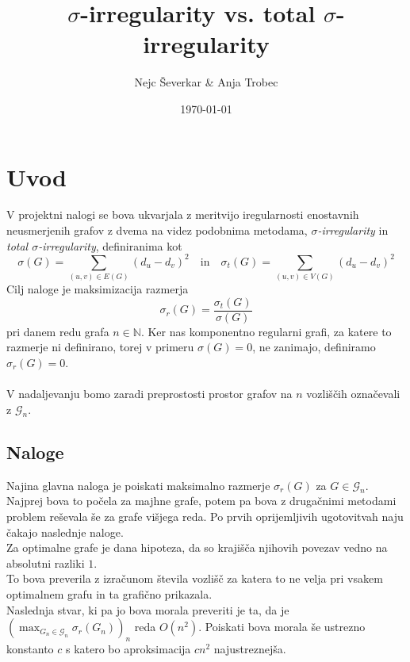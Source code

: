 \documentclass[ letterpaper, titlepage, fleqn]{article}
\begin{document}
\title{$\sigma$-irregularity vs. total $\sigma$-irregularity}
\author{Nejc Ševerkar \& Anja Trobec}
\date{\today}
\maketitle
\pagebreak

\thispagestyle{empty}
\tableofcontents
\pagebreak

\section{Uvod}

V projektni nalogi se bova ukvarjala z meritvijo iregularnosti enostavnih neusmerjenih grafov z
dvema na videz podobnima metodama, {\em $\sigma$-irregularity} in {\em total $\sigma$-irregularity},
definiranima kot 
$$
\sigma(G) = \sum_{(u, v) \in E(G)}(d_u - d_v)^2 
\quad \text{in} \quad
\sigma_t(G) = \sum_{(u, v) \in V(G)}(d_u - d_v)^2
$$
Cilj naloge je maksimizacija razmerja 
$$\sigma_r(G) = \frac{\sigma_t(G)}{\sigma(G)}$$
pri danem redu grafa $n \in \mathbb{N}$.
Ker nas komponentno regularni grafi, za katere to razmerje ni definirano,
torej v primeru $\sigma(G) = 0$, ne zanimajo, definiramo $\sigma_r(G) = 0$.
\\\\
V nadaljevanju bomo zaradi preprostosti prostor grafov na $n$ vozliščih označevali z $\mathscr{G}_n$.

\subsection{Naloge}

Najina glavna naloga je poiskati maksimalno razmerje $\sigma_r(G)$ za $G \in \mathscr{G}_n$.
Najprej bova to počela za majhne grafe, potem pa bova z drugačnimi metodami problem reševala še za grafe višjega reda. 
Po prvih oprijemljivih ugotovitvah naju čakajo naslednje naloge. \\

Za optimalne grafe je dana hipoteza, da so krajišča njihovih povezav vedno na absolutni razliki $1$. \\
To bova preverila z izračunom števila vozlišč za katera
to ne velja pri vsakem optimalnem grafu in ta grafično prikazala. \\

Naslednja stvar, ki pa jo bova morala preveriti je ta, da je $(\max_{G_n \in \mathscr{G}_n} \sigma_r(G_n))_n$ 
reda $O(n^2)$. 
Poiskati bova morala še ustrezno konstanto $c$ s katero bo aproksimacija $cn^2$ najustreznejša.
\end{document}

